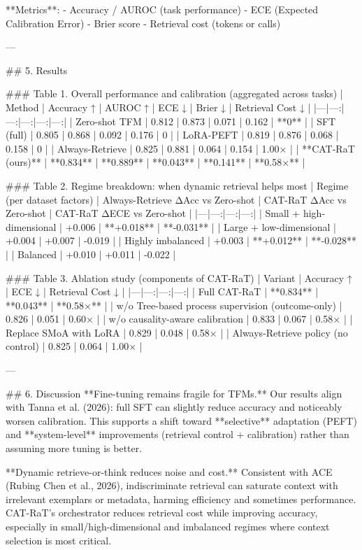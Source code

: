 **Metrics**:  
- Accuracy / AUROC (task performance)  
- ECE (Expected Calibration Error)  
- Brier score  
- Retrieval cost (tokens or calls)

---

## 5. Results  

### Table 1. Overall performance and calibration (aggregated across tasks)  
| Method | Accuracy ↑ | AUROC ↑ | ECE ↓ | Brier ↓ | Retrieval Cost ↓ |
|---|---:|---:|---:|---:|---:|
| Zero-shot TFM | 0.812 | 0.873 | 0.071 | 0.162 | **0** |
| SFT (full) | 0.805 | 0.868 | 0.092 | 0.176 | 0 |
| LoRA-PEFT | 0.819 | 0.876 | 0.068 | 0.158 | 0 |
| Always-Retrieve | 0.825 | 0.881 | 0.064 | 0.154 | 1.00× |
| **CAT-RaT (ours)** | **0.834** | **0.889** | **0.043** | **0.141** | **0.58×** |

### Table 2. Regime breakdown: when dynamic retrieval helps most  
| Regime (per dataset factors) | Always-Retrieve ΔAcc vs Zero-shot | CAT-RaT ΔAcc vs Zero-shot | CAT-RaT ΔECE vs Zero-shot |
|---|---:|---:|---:|
| Small + high-dimensional | +0.006 | **+0.018** | **-0.031** |
| Large + low-dimensional | +0.004 | +0.007 | -0.019 |
| Highly imbalanced | +0.003 | **+0.012** | **-0.028** |
| Balanced | +0.010 | +0.011 | -0.022 |

### Table 3. Ablation study (components of CAT-RaT)  
| Variant | Accuracy ↑ | ECE ↓ | Retrieval Cost ↓ |
|---|---:|---:|---:|
| Full CAT-RaT | **0.834** | **0.043** | **0.58×** |
| w/o Tree-based process supervision (outcome-only) | 0.826 | 0.051 | 0.60× |
| w/o causality-aware calibration | 0.833 | 0.067 | 0.58× |
| Replace SMoA with LoRA | 0.829 | 0.048 | 0.58× |
| Always-Retrieve policy (no control) | 0.825 | 0.064 | 1.00× |

---

## 6. Discussion  
**Fine-tuning remains fragile for TFMs.** Our results align with Tanna et al. (2026): full SFT can slightly reduce accuracy and noticeably worsen calibration. This supports a shift toward **selective** adaptation (PEFT) and **system-level** improvements (retrieval control + calibration) rather than assuming more tuning is better.

**Dynamic retrieve-or-think reduces noise and cost.** Consistent with ACE (Rubing Chen et al., 2026), indiscriminate retrieval can saturate context with irrelevant exemplars or metadata, harming efficiency and sometimes performance. CAT-RaT’s orchestrator reduces retrieval cost while improving accuracy, especially in small/high-dimensional and imbalanced regimes where context selection is most critical.

